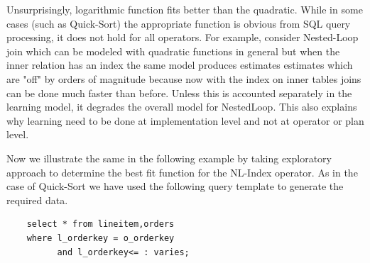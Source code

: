 \documentclass{article}
\begin{document}
\begin{multicols}{2}
\begin{center}
\end{center}

	Unsurprisingly, logarithmic function fits better than the quadratic. 
	While in some cases (such as Quick-Sort) the appropriate function is obvious from SQL
	query processing, it does not hold for all operators. 
	For example, consider Nested-Loop join which 
	can be modeled with quadratic functions in general but when the inner relation has an 
	index 
	the same model produces estimates estimates which are 
	"off" by orders of magnitude because now with the index on inner tables joins can be done much faster than before. Unless this is accounted separately in the learning model, it degrades the overall model for NestedLoop. This also explains why learning need to be done at implementation level and not at operator or plan level. 
	
Now we illustrate the same in the following example by taking exploratory approach to determine the best fit function for the NL-Index operator.
	As in the case of Quick-Sort we have used the following query template to generate the required
	data.
	
	\begin{framed}
	\begin{verbatim}
	select * from lineitem,orders
	where l_orderkey = o_orderkey 
		  and l_orderkey<= : varies;
	\end{verbatim}
	\end{framed}
	

\end{multicols}
\end{document}
